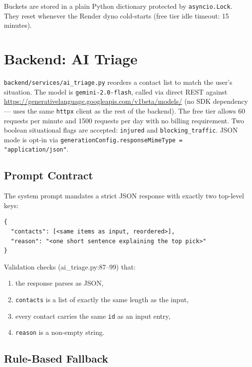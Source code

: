 \documentclass[11pt, a4paper]{article}
\newcommand{\file}[1]{\texttt{\small\color{rsblue}#1}}
\newcommand{\code}[1]{\texttt{\small#1}}
\begin{document}
Buckets are stored in a plain Python dictionary protected by \code{asyncio.Lock}. They reset whenever the Render dyno cold-starts (free tier idle timeout: 15 minutes).

\section{Backend: AI Triage}

\file{backend/services/ai\_triage.py} reorders a contact list to match the user's situation. The model is \texttt{gemini-2.0-flash}, called via direct REST against \url{https://generativelanguage.googleapis.com/v1beta/models/} (no SDK dependency --- uses the same \code{httpx} client as the rest of the backend). The free tier allows 60 requests per minute and 1500 requests per day with no billing requirement. Two boolean situational flags are accepted: \code{injured} and \code{blocking\_traffic}. JSON mode is opt-in via \code{generationConfig.responseMimeType = "application/json"}.

\subsection{Prompt Contract}

The system prompt mandates a strict JSON response with exactly two top-level keys:

\begin{lstlisting}[language={},caption={Required model output schema}]
{
  "contacts": [<same items as input, reordered>],
  "reason": "<one short sentence explaining the top pick>"
}
\end{lstlisting}

Validation checks (ai\_triage.py:87--99) that:

\begin{enumerate}[leftmargin=*, itemsep=2pt, topsep=2pt]
  \item the response parses as JSON,
  \item \code{contacts} is a list of exactly the same length as the input,
  \item every contact carries the same \code{id} as an input entry,
  \item \code{reason} is a non-empty string.
\end{enumerate}

\subsection{Rule-Based Fallback}
\end{document}
